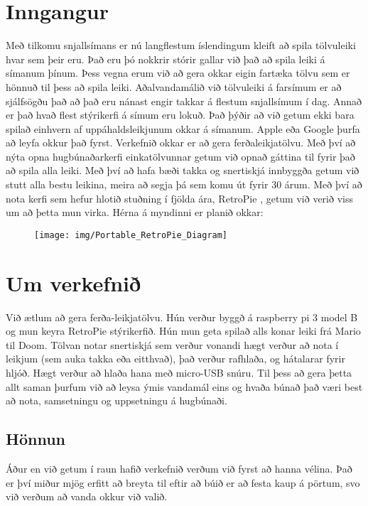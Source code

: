 \section{Inngangur}
Með tilkomu snjallsímans er nú langflestum íslendingum kleift að spila tölvuleiki hvar sem þeir eru. Það eru þó nokkrir stórir gallar við það að spila leiki á símanum þínum. Þess vegna erum við að gera okkar eigin fartæka tölvu sem er hönnuð til þess að spila leiki. Aðalvandamálið við tölvuleiki á farsímum er að sjálfsögðu það að það eru nánast engir takkar á flestum snjallsímum í dag. Annað er það hvað flest stýrikerfi á símum eru lokuð. Það þýðir að við getum ekki bara spilað einhvern af uppáhaldsleikjunum okkar á símanum. Apple eða Google þurfa að leyfa okkur það fyrst. Verkefnið okkar er að gera ferðaleikjatölvu. Með því að nýta opna hugbúnaðarkerfi einkatölvunnar getum við opnað gáttina til fyrir það að spila alla leiki. Með því að hafa bæði takka og snertiskjá innbyggða getum við stutt alla bestu leikina, meira að segja þá sem komu út fyrir 30 árum. Með því að nota kerfi sem hefur hlotið stuðning í fjölda ára, RetroPie \cite{mckittrick2015retropie}, getum við verið viss um að þetta mun virka. Hérna á myndinni er planið okkar:

\begin{figure}[h]
\texttt{[image: img/Portable\_RetroPie\_Diagram]}
\end{figure}
\section{Um verkefnið}
Við ætlum að gera ferða-leikjatölvu. Hún verður byggð á raspberry pi 3 model B og mun keyra RetroPie stýrikerfið. Hún mun geta spilað alls konar leiki frá Mario til Doom. Tölvan notar snertiskjá sem verður vonandi hægt verður að nota í leikjum (sem auka takka eða eitthvað), það verður rafhlaða, og hátalarar fyrir hljóð. Hægt verður að hlaða hana með micro-USB snúru. Til þess að gera þetta allt saman þurfum við að leysa ýmis vandamál eins og hvaða búnað það væri best að nota, samsetningu og uppsetningu á hugbúnaði. 

\subsection{Hönnun}

Áður en við getum í raun hafið verkefnið verðum við fyrst að hanna vélina. Það er því miður mjög erfitt að breyta til eftir að búið er að festa kaup á pörtum, svo við verðum að vanda okkur við valið.

